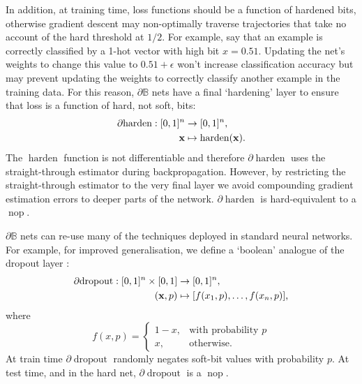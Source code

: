 \documentclass{article} %
\begin{document}
In addition, at training time, loss functions should be a function of hardened bits, otherwise gradient descent may non-optimally traverse trajectories that take no account of the hard threshold at $1/2$. For example, say that an example is correctly classified by a 1-hot vector with high bit $x=0.51$. Updating the net's weights to change this value to $0.51+\epsilon$ won't increase classification accuracy but may prevent updating the weights to correctly classify another example in the training data. For this reason, $\partial\mathbb{B}$ nets have a final `hardening' layer to ensure that loss is a function of hard, not soft, bits:
\begin{equation*}
\begin{aligned}
\partial\!\operatorname{harden}: [0,1]^{n} &\to [0,1]^{n}, \\
{\bf x} &\mapsto \operatorname{harden}({\bf x})\text{.}
\end{aligned}
\end{equation*}
The $\operatorname{harden}$ function is not differentiable and therefore $\partial\!\operatorname{harden}$ uses the straight-through estimator \citep{DBLP:journals/corr/BengioLC13} during backpropagation. However, by restricting the straight-through estimator to the very final layer we avoid compounding gradient estimation errors to deeper parts of the network. $\partial\!\operatorname{harden}$ is hard-equivalent to a $\operatorname{nop}$.

$\partial\mathbb{B}$ nets can re-use many of the techniques deployed in standard neural networks. For example, for improved generalisation, we define a `boolean' analogue of the dropout layer \citep{JMLR:v15:srivastava14a}:
\begin{equation*}
\begin{aligned}
\partial\!\operatorname{dropout}: [0,1]^{n} \times [0,1] &\to [0,1]^{n}, \\
({\bf x}, p) &\mapsto [f(x_{1}, p), \dots, f(x_{n}, p)]\text{,}
\end{aligned}
\end{equation*}
where
\begin{equation*}
f(x, p) = \begin{cases}
1 - x, & \text{with probability } p \\
x, & \text{otherwise.}
\end{cases}
\end{equation*}
At train time $\partial\!\operatorname{dropout}$ randomly negates soft-bit values with probability $p$. At test time, and in the hard net, $\partial\!\operatorname{dropout}$ is a $\operatorname{nop}$.
\end{document}
